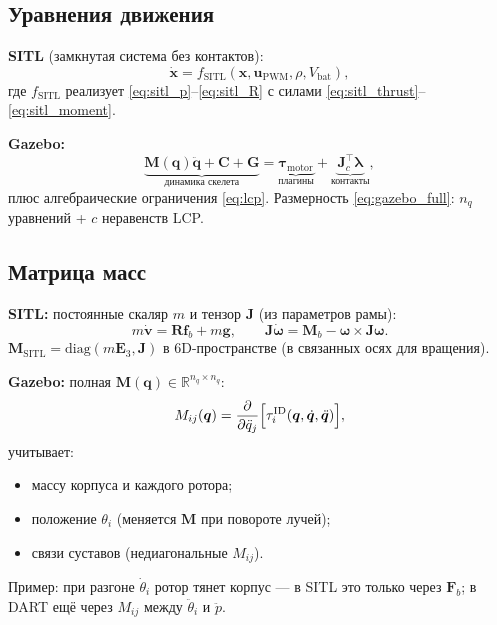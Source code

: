 \documentclass[a4paper,11pt]{article}
\newcommand{\R}{\mathbb{R}}
\newcommand{\vect}[1]{\bm{#1}}
\newcommand{\mat}[1]{\bm{#1}}
\begin{document}
\subsection{Уравнения движения}

\textbf{SITL} (замкнутая система без контактов):
\begin{equation}
  \dot{\vect{x}} =
  f_{\mathrm{SITL}}(\vect{x}, \vect{u}_{\mathrm{PWM}}, \rho, V_{\mathrm{bat}}),
  \label{eq:sitl_ode}
\end{equation}
где $f_{\mathrm{SITL}}$ реализует \eqref{eq:sitl_p}--\eqref{eq:sitl_R}
с силами \eqref{eq:sitl_thrust}--\eqref{eq:sitl_moment}.

\textbf{Gazebo:}
\begin{equation}
  \underbrace{\mat{M}(\vect{q})\ddot{\vect{q}}
  + \vect{C} + \vect{G}}_{\text{динамика скелета}}
  =
  \underbrace{\vect{\tau}_{\mathrm{motor}}}_{\text{плагины}}
  +
  \underbrace{\vect{J}_c^\top \vect{\lambda}}_{\text{контакты}},
  \label{eq:gazebo_full}
\end{equation}
плюс алгебраические ограничения \eqref{eq:lcp}.
Размерность \eqref{eq:gazebo_full}: $n_q$ уравнений + $c$ неравенств LCP.

\subsection{Матрица масс}

\textbf{SITL:} постоянные скаляр $m$ и тензор $\mat{J}$ (из параметров рамы):
\begin{equation}
  m\dot{\vect{v}} = \mat{R}\vect{f}_b + m\vect{g},
  \qquad
  \mat{J}\dot{\vect{\omega}} = \vect{M}_b - \vect{\omega}\times\mat{J}\vect{\omega}.
  \label{eq:sitl_mass_const}
\end{equation}
$\mat{M}_{\mathrm{SITL}} = \mathrm{diag}(m\mat{E}_3, \mat{J})$ в 6D-пространстве
(в связанных осях для вращения).

\textbf{Gazebo:} полная $\mat{M}(\vect{q}) \in \R^{n_q \times n_q}$:
\begin{equation}
  M_{ij}(\vect{q}) =
  \frac{\partial}{\partial \ddot{q}_j}
  \Bigl[\tau_i^{\mathrm{ID}}(\vect{q},\dot{\vect{q}},\ddot{\vect{q}})\Bigr],
  \label{eq:mass_matrix_def}
\end{equation}
учитывает:
\begin{itemize}
  \item массу корпуса и каждого ротора;
  \item положение $\theta_i$ (меняется $\mat{M}$ при повороте лучей);
  \item связи суставов (недиагональные $M_{ij}$).
\end{itemize}
Пример: при разгоне $\dot{\theta}_i$ ротор тянет корпус --- в SITL это
только через $\vect{F}_b$; в DART ещё через $M_{ij}$ между $\ddot{\theta}_i$
и $\ddot{p}$.
\end{document}
